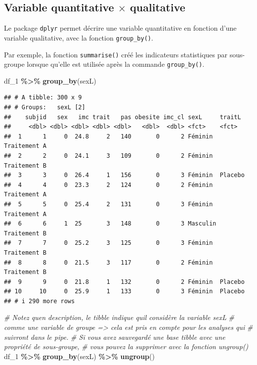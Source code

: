 \documentclass[
]{book}
\newenvironment{Shaded}{\begin{snugshade}}{\end{snugshade}}
\newcommand{\CommentTok}[1]{\textcolor[rgb]{0.56,0.35,0.01}{\textit{#1}}}
\newcommand{\FunctionTok}[1]{\textcolor[rgb]{0.13,0.29,0.53}{\textbf{#1}}}
\newcommand{\NormalTok}[1]{#1}
\newcommand{\SpecialCharTok}[1]{\textcolor[rgb]{0.81,0.36,0.00}{\textbf{#1}}}
\begin{document}
\subsection{\texorpdfstring{Variable quantitative \(\times\) qualitative}{Variable quantitative \textbackslash times qualitative}}\label{variable-quantitative-times-qualitative-1}

Le package \texttt{dplyr} permet décrire une variable quantitative en fonction d'une variable qualitative, avec la fonction \texttt{group\_by()}.

Par exemple, la fonction \texttt{summarise()} créé les indicateurs statistiques par sous-groupe lorsque qu'elle est utilisée après la commande \texttt{group\_by()}.

\begin{Shaded}
\begin{Highlighting}[]
\NormalTok{df\_1 }\SpecialCharTok{\%\textgreater{}\%}
  \FunctionTok{group\_by}\NormalTok{(sexL)}
\end{Highlighting}
\end{Shaded}

\begin{verbatim}
## # A tibble: 300 x 9
## # Groups:   sexL [2]
##    subjid   sex   imc trait   pas obesite imc_cl sexL     traitL      
##     <dbl> <dbl> <dbl> <dbl> <dbl>   <dbl>  <dbl> <fct>    <fct>       
##  1      1     0  24.8     2   140       0      2 Féminin  Traitement A
##  2      2     0  24.1     3   109       0      2 Féminin  Traitement B
##  3      3     0  26.4     1   156       0      3 Féminin  Placebo     
##  4      4     0  23.3     2   124       0      2 Féminin  Traitement A
##  5      5     0  25.4     2   131       0      3 Féminin  Traitement A
##  6      6     1  25       3   148       0      3 Masculin Traitement B
##  7      7     0  25.2     3   125       0      3 Féminin  Traitement B
##  8      8     0  21.5     3   117       0      2 Féminin  Traitement B
##  9      9     0  21.8     1   132       0      2 Féminin  Placebo     
## 10     10     0  25.9     1   133       0      3 Féminin  Placebo     
## # i 290 more rows
\end{verbatim}

\begin{Shaded}
\begin{Highlighting}[]
\CommentTok{\# Notez qu\textquotesingle{}en description, le tibble indique qu\textquotesingle{}il considère la variable sexL}
\CommentTok{\# comme une variable de groupe =\textgreater{} cela est pris en compte pour les analyses qui }
\CommentTok{\# suivront dans le pipe.}
\CommentTok{\# Si vous avez sauvegardé une base tibble avec une propriété de sous{-}groupe, }
\CommentTok{\# vous pouvez la supprimer avec la fonction ungroup()}
\NormalTok{df\_1 }\SpecialCharTok{\%\textgreater{}\%}
  \FunctionTok{group\_by}\NormalTok{(sexL) }\SpecialCharTok{\%\textgreater{}\%}
  \FunctionTok{ungroup}\NormalTok{()}
\end{Highlighting}
\end{Shaded}
\end{document}
